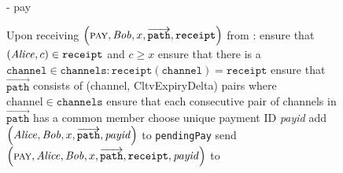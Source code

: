   \begin{figure}[H]
    \begin{systembox}{\fpaynet - pay}
      \begin{algorithmic}[1]
        \State Upon receiving $\left(\textsc{pay}, \mathit{Bob}, x,
        \overrightarrow{\mathtt{path}}, \mathtt{receipt}\right)$ from \alice:
        \Indent
          \State ensure that $\left(\mathit{Alice}, c\right) \in \mathtt{receipt}$ and
          $c \geq x$
          \State ensure that there is a $\mathtt{channel} \in \mathtt{channels}
          : \mathtt{receipt}\left(\mathtt{channel}\right) = \mathtt{receipt}$
          \State ensure that $\overrightarrow{\mathtt{path}}$ consists of
          (channel, CltvExpiryDelta) pairs where $\mathrm{channel} \in
          \mathtt{channels}$
          \State ensure that each consecutive pair of channels in
          $\overrightarrow{\mathtt{path}}$ has a common member
          \State choose unique payment ID \textit{payid}
          \State add $\left(\mathit{Alice}, \mathit{Bob}, x, \overrightarrow{\mathtt{path}},
          \mathit{payid}\right)$ to \texttt{pendingPay}
          \State send $\left(\textsc{pay}, \mathit{Alice}, \mathit{Bob}, x,
          \overrightarrow{\mathtt{path}}, \mathtt{receipt},
          \mathit{payid}\right)$ to \simulator
        \EndIndent
        \Statex


\end{algorithmic}
\end{systembox}
\end{figure}
